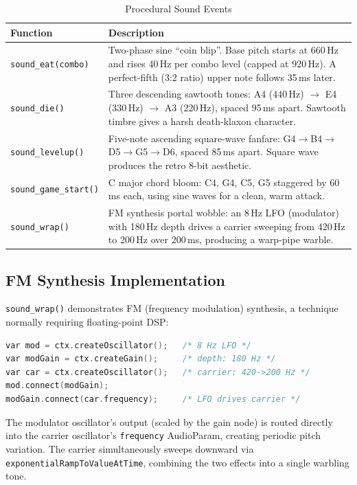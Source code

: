 \documentclass[conference]{IEEEtran}
\begin{document}
\begin{table}[h]
\centering
\caption{Procedural Sound Events}
\begin{tabular}{lp{4.8cm}}
\toprule
\textbf{Function} & \textbf{Description} \\
\midrule
\texttt{sound\_eat(combo)} & Two-phase sine ``coin blip''. Base pitch starts at 660\,Hz and rises 40\,Hz per combo level (capped at 920\,Hz). A perfect-fifth (3:2 ratio) upper note follows 35\,ms later. \\
\texttt{sound\_die()} & Three descending sawtooth tones: A4 (440\,Hz) $\to$ E4 (330\,Hz) $\to$ A3 (220\,Hz), spaced 95\,ms apart. Sawtooth timbre gives a harsh death-klaxon character. \\
\texttt{sound\_levelup()} & Five-note ascending square-wave fanfare: G4$\to$B4$\to$D5$\to$G5$\to$D6, spaced 85\,ms apart. Square wave produces the retro 8-bit aesthetic. \\
\texttt{sound\_game\_start()} & C major chord bloom: C4, G4, C5, G5 staggered by 60\,ms each, using sine waves for a clean, warm attack. \\
\texttt{sound\_wrap()} & FM synthesis portal wobble: an 8\,Hz LFO (modulator) with 180\,Hz depth drives a carrier sweeping from 420\,Hz to 200\,Hz over 200\,ms, producing a warp-pipe warble. \\
\bottomrule
\end{tabular}
\end{table}

\subsection{FM Synthesis Implementation}

\texttt{sound\_wrap()} demonstrates FM (frequency modulation) synthesis, a
technique normally requiring floating-point DSP:

\begin{lstlisting}[language=C]
var mod = ctx.createOscillator();   /* 8 Hz LFO */
var modGain = ctx.createGain();     /* depth: 180 Hz */
var car = ctx.createOscillator();   /* carrier: 420->200 Hz */
mod.connect(modGain);
modGain.connect(car.frequency);     /* LFO drives carrier */
\end{lstlisting}

The modulator oscillator's output (scaled by the gain node) is routed
directly into the carrier oscillator's \texttt{frequency} AudioParam,
creating periodic pitch variation. The carrier simultaneously sweeps
downward via \texttt{exponentialRampToValueAtTime}, combining the two
effects into a single warbling tone.
\end{document}
